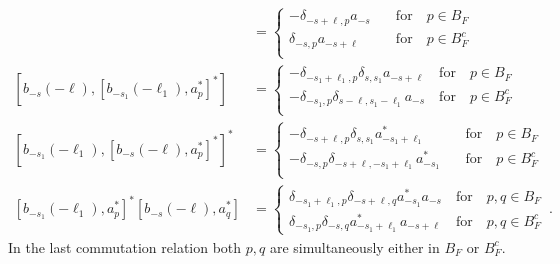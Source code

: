 \documentclass[sn-mathphys, Numbered ,a4paper]{sn-jnl}%
\theoremstyle{plain}
\theoremstyle{definition}
\theoremstyle{remark}
\theoremstyle{plain}
\theoremstyle{definition}
\theoremstyle{remark}
\begin{document}
\begin{align}
	[b_{-s}(-\ell), a^*_{p}] &= 
	\begin{cases}
		-\delta_{-s+\ell,p}a_{-s} \quad&\text{for}\quad p \in B_F\\
		\delta_{-s,p}a_{-s+\ell} \quad&\text{for}\quad p \in B^c_F\\
	\end{cases}\label{eq:comm2}\\
	\left[b_{-s}(-\ell), [b_{-s_1}(-\ell_1),a^*_{p}]^*\right]&=\begin{cases}
		-\delta_{-s_1+\ell_1,p}\delta_{s,s_1}a_{-s+\ell} \quad\text{for}\quad p \in B_F\\
		-\delta_{-s_1,p}\delta_{s-\ell,s_1-\ell_1}a_{-s} \quad\text{for}\quad p \in B^c_F\\
	\end{cases}\label{eq:comm3}\\
	\left[b_{-s_1}(-\ell_1),[b_{-s}(-\ell), a^*_{p}]^* \right]^* &=\begin{cases}
		-\delta_{-s+\ell,p}\delta_{s,s_1}a^*_{-s_1+\ell_1} \quad&\text{for}\quad p \in B_F\\
		-\delta_{-s,p}\delta_{-s+\ell,-s_1+\ell_1}a^*_{-s_1} \quad&\text{for}\quad p \in B^c_F\\
	\end{cases}\label{eq:comm4}\\
	[b_{-s_1}(-\ell_1),a^*_{p}]^*[b_{-s}(-\ell), a^*_{q}] 
	&=\begin{cases}
		\delta_{-s_1+\ell_1,p}\delta_{-s+\ell,q}a^*_{-s_1}a_{-s} \quad\text{for}\quad p,q \in B_F\\
		\delta_{-s_1,p}\delta_{-s,q}a^*_{-s_1+\ell_1}a_{-s+\ell} \quad\text{for}\quad p,q \in B^c_F 
	\end{cases}\label{eq:comm5}\,.
\end{align}
In the last commutation relation both $p,q$ are simultaneously either in $B_F$ or $B_F^c$.
\end{document}
